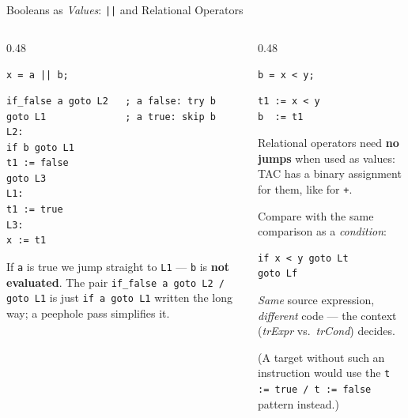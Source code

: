 \documentclass[aspectratio=169]{beamer}
\newcommand{\tc}[1]{\texttt{#1}}
\begin{document}
\begin{frame}[fragile]{Booleans as \emph{Values}: \tc{||} and Relational Operators}
  \begin{columns}[T]
    \begin{column}{0.48\textwidth}
      \begin{block}{\tc{x = a || b;}}
        \begin{verbatim}
if_false a goto L2   ; a false: try b
goto L1              ; a true: skip b
L2:
if b goto L1
t1 := false
goto L3
L1:
t1 := true
L3:
x := t1
        \end{verbatim}
      \end{block}
      \scriptsize
      If \tc{a} is true we jump straight to \tc{L1} — \tc{b} is
      \textbf{not evaluated}. The pair \tc{if\_false a goto L2 / goto L1}
      is just \tc{if a goto L1} written the long way; a peephole pass
      simplifies it.
    \end{column}
    \begin{column}{0.48\textwidth}
      \begin{block}{\tc{b = x < y;}}
        \begin{verbatim}
t1 := x < y
b  := t1
        \end{verbatim}
      \end{block}
      \scriptsize
      Relational operators need \textbf{no jumps} when used as values:
      TAC has a binary assignment for them, like for \tc{+}.

      \medskip
      Compare with the same comparison as a \emph{condition}:
      \begin{verbatim}
if x < y goto Lt
goto Lf
      \end{verbatim}
      \emph{Same} source expression, \emph{different} code — the context
      (\textit{trExpr} vs.\ \textit{trCond}) decides.

      \medskip
      (A target without such an instruction would use the
      \tc{t := true / t := false} pattern instead.)
    \end{column}
  \end{columns}
\end{frame}
\end{document}

